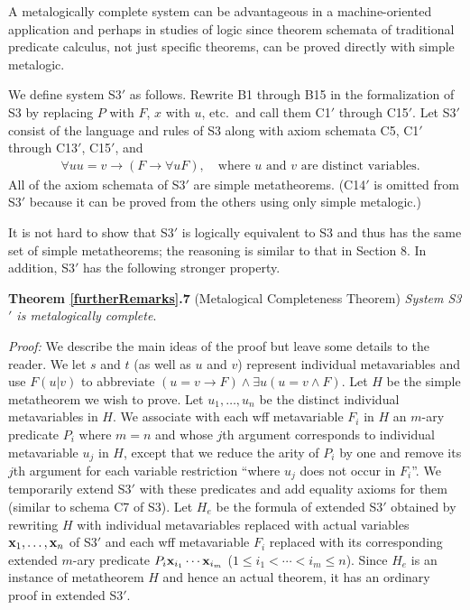 \documentclass[leqno]{article}
\begin{document}
A metalogically complete system can be advantageous in a machine-oriented
application and perhaps in studies of logic since theorem schemata of
traditional predicate calculus, not just specific theorems, can be proved
directly with simple metalogic.

We define system S3\mbox{$'$} as follows.  Rewrite B1 through B15 in the
formalization of S3 by replacing $P$ with $F$, $x$ with $u$, etc.\ and call
them C1\mbox{$'$} through C15\mbox{$'$}.  Let S3\mbox{$'$} consist of the
language and rules of S3 along with axiom schemata C5, C1\mbox{$'$} through
C13\mbox{$'$}, C15\mbox{$'$}, and
\setcounter{equation}{15}
\renewcommand{\theequation}{C\arabic{equation}\mbox{$'$}}
\begin{eqnarray} %
   & \forall uu=v\rightarrow (F\rightarrow \forall uF){,}\quad
          \mbox{where $u$ and $v$ are distinct
           variables.}
\end{eqnarray}
All of the axiom schemata of S3\mbox{$'$} are simple metatheorems.
(C14\mbox{$'$} is omitted from S3\mbox{$'$} because it can be proved from the
others using only simple metalogic.)

It is not hard to show that S3\mbox{$'$} is logically equivalent to S3
and thus has the same set of simple metatheorems; the reasoning is
similar to that in Section 8. In addition, S3\mbox{$'$} has the
following stronger property.

{\bf Theorem \ref{furtherRemarks}.7} (Metalogical Completeness Theorem)
\hspace{.5em} {\em System {\rm S3\mbox{$'$}} is metalogically complete}.

{\em Proof:} We describe the main ideas of the proof but leave some details
to the reader.  We let $s$ and $t$ (as well as $u$ and $v$) represent
individual metavariables and use $F(u|v)$ to abbreviate $(u=v\rightarrow
F)\wedge \exists u(u=v\wedge F)$.  Let $H$ be the simple metatheorem we wish
to prove.  Let $u_1,\ldots ,u_n$ be the distinct individual metavariables in
$H$.  We associate with each wff metavariable $F_i$ in $H$ an $m$-ary
predicate $P_i$ where $m=n$ and whose $j$th argument corresponds to
individual metavariable $u_j$ in $H$, except that we reduce the arity of
$P_i$ by one and remove its $j$th argument for each variable restriction
``where $u_j$ does not occur in $F_i$''.  We temporarily extend S3\mbox{$'$}
with these predicates and add equality axioms for them (similar to schema C7
of S3).  Let $H_e$ be the formula of extended S3\mbox{$'$} obtained by
rewriting $H$ with individual metavariables replaced with actual variables
${\bf x}_1,\dots ,{\bf x}_n$ of S3\mbox{$'$} and each wff metavariable $F_i$
replaced with its corresponding extended $m$-ary predicate $P_i{\bf
x}_{i_1}\cdots {\bf x}_{i_m}$ ($1 \le i_1 < \cdots < i_m \le n$).  Since
$H_e$ is an instance of metatheorem $H$ and hence an actual theorem, it has
an ordinary proof in extended S3\mbox{$'$}.
\end{document}
